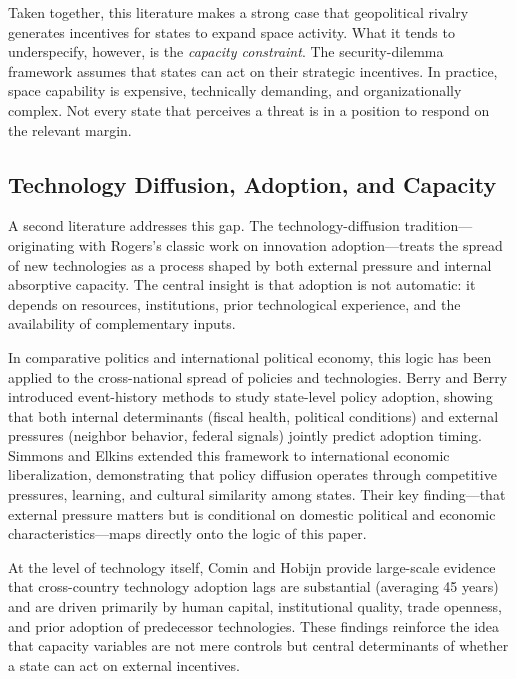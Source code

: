\documentclass[11pt]{article}
\begin{document}
Taken together, this literature makes a strong case that geopolitical rivalry generates incentives for states to expand space activity. What it tends to underspecify, however, is the \emph{capacity constraint}. The security-dilemma framework assumes that states can act on their strategic incentives. In practice, space capability is expensive, technically demanding, and organizationally complex. Not every state that perceives a threat is in a position to respond on the relevant margin.

\subsection{Technology Diffusion, Adoption, and Capacity}

A second literature addresses this gap. The technology-diffusion tradition---originating with Rogers's \cite{rogers2003} classic work on innovation adoption---treats the spread of new technologies as a process shaped by both external pressure and internal absorptive capacity. The central insight is that adoption is not automatic: it depends on resources, institutions, prior technological experience, and the availability of complementary inputs.

In comparative politics and international political economy, this logic has been applied to the cross-national spread of policies and technologies. Berry and Berry \cite{berry1990} introduced event-history methods to study state-level policy adoption, showing that both internal determinants (fiscal health, political conditions) and external pressures (neighbor behavior, federal signals) jointly predict adoption timing. Simmons and Elkins \cite{simmons2004} extended this framework to international economic liberalization, demonstrating that policy diffusion operates through competitive pressures, learning, and cultural similarity among states. Their key finding---that external pressure matters but is conditional on domestic political and economic characteristics---maps directly onto the logic of this paper.

At the level of technology itself, Comin and Hobijn \cite{comin2010} provide large-scale evidence that cross-country technology adoption lags are substantial (averaging 45 years) and are driven primarily by human capital, institutional quality, trade openness, and prior adoption of predecessor technologies. These findings reinforce the idea that capacity variables are not mere controls but central determinants of whether a state can act on external incentives.
\end{document}
